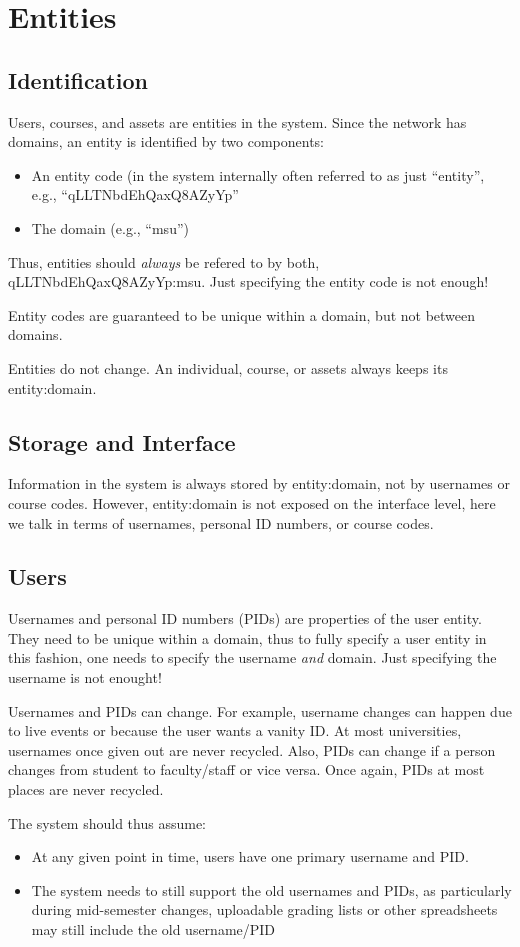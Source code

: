 \chapter{Entities}
\section{Identification}
Users, courses, and assets are entities in the system. Since the network has domains, an entity is identified by two components:
\begin{itemize}
\item An entity code (in the system internally often referred to as just ``entity'', e.g., ``qLLTNbdEhQaxQ8AZyYp''
\item The domain (e.g., ``msu'')
\end{itemize}
Thus, entities should {\it always} be refered to by both, qLLTNbdEhQaxQ8AZyYp:msu. Just specifying the entity code is not enough!

Entity codes are guaranteed to be unique within a domain, but not between domains.

Entities do not change. An individual, course, or assets always keeps its entity:domain.
\section{Storage and Interface}
Information in the system is always stored by entity:domain, not by usernames or course codes. However, entity:domain is not exposed on the interface level, here we talk in terms of usernames, personal ID numbers, or course codes.
\section{Users}
Usernames and personal ID numbers (PIDs) are properties of the user entity. They need to be unique within a domain, thus to fully specify a user entity in this fashion, one needs to specify the username {\it and} domain. Just specifying the username is not enought!

Usernames and PIDs can change. For example, username changes can happen due to live events or because the user wants a vanity ID. At most universities, usernames once given out are never recycled. Also, PIDs can change if a person changes from student to faculty/staff or vice versa. Once again, PIDs at most places are never recycled.

The system should thus assume:
\begin{itemize}
\item At any given point in time, users have one primary username and PID.
\item The system needs to still support the old usernames and PIDs, as particularly during mid-semester changes, uploadable grading lists or other spreadsheets may still include the old username/PID
\end{itemize}

